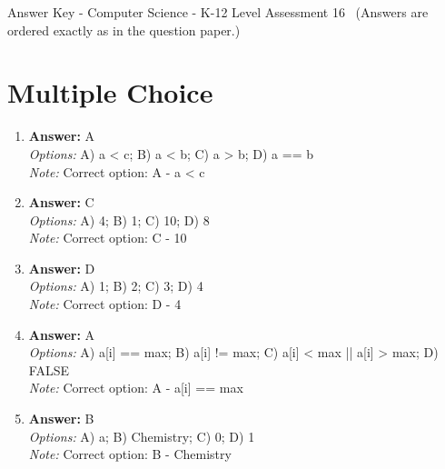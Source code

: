 \documentclass[12pt]{article}
\begin{document}
\begin{center}
Answer Key - Computer Science - K-12 Level Assessment 16 \
\small (Answers are ordered exactly as in the question paper.)
\end{center}

\section*{Multiple Choice}
\begin{enumerate}[label=\arabic*.]
\item \textbf{Answer:} A
\\ \textit{Options:} A) a \textless{} c; B) a \textless{} b; C) a \textgreater{} b; D) a == b
\\ \textit{Note:} Correct option: A - a \textless{} c
\item \textbf{Answer:} C
\\ \textit{Options:} A) 4; B) 1; C) 10; D) 8
\\ \textit{Note:} Correct option: C - 10
\item \textbf{Answer:} D
\\ \textit{Options:} A) 1; B) 2; C) 3; D) 4
\\ \textit{Note:} Correct option: D - 4
\item \textbf{Answer:} A
\\ \textit{Options:} A) a[i] == max; B) a[i] != max; C) a[i] \textless{} max || a[i] \textgreater{} max; D) FALSE
\\ \textit{Note:} Correct option: A - a[i] == max
\item \textbf{Answer:} B
\\ \textit{Options:} A) a; B) Chemistry; C) 0; D) 1
\\ \textit{Note:} Correct option: B - Chemistry
\end{enumerate}
\end{document}
